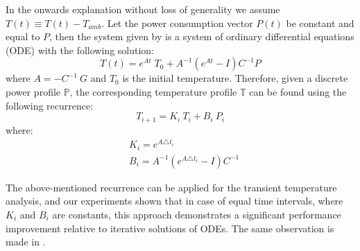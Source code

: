 In the onwards explanation without loss of generality we assume $T(t) \equiv T(t) - T_{amb}$. Let the power consumption vector $P(t)$ be constant and equal to $P$, then the system given by  is a system of ordinary differential equations (ODE) with the following solution:
\begin{equation} \label{eq:solution}
  T(t) = e^{A t} \; T_0 + A^{-1}(e^{A t} - I)C^{-1} P
\end{equation}
where $A = -C^{-1} \: G$ and $T_0$ is the initial temperature. Therefore, given a discrete power profile $\mathbb{P}$, the corresponding temperature profile $\mathbb{T}$ can be found using the following recurrence:
\begin{equation} \label{eq:recurrent-system}
  T_{i+1} = K_i \: T_i + B_i \: P_i
\end{equation}
where:
\begin{align*}
  & K_i = e^{A \triangle t_i} \\
  & B_i = A^{-1}(e^{A \triangle t_i} - I)C^{-1}
\end{align*}

The above-mentioned recurrence can be applied for the transient temperature analysis, and our experiments shown that in case of equal time intervals, where $K_i$ and $B_i$ are constants, this approach demonstrates a significant performance improvement relative to iterative solutions of ODEs. The same observation is made in \cite{thiele2011}.

